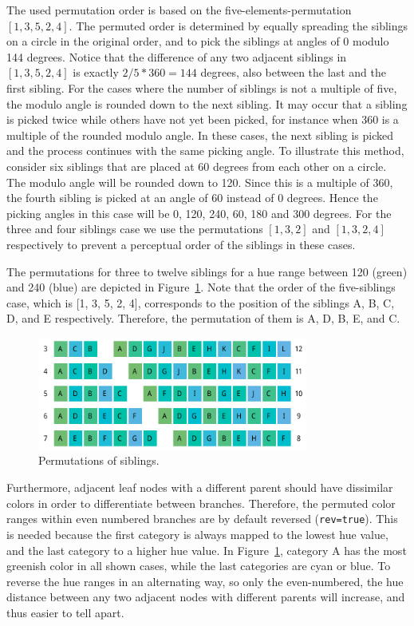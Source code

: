 \documentclass[journal]{vgtc}                %
\begin{document}
The used permutation order is based on the five-elements-permutation $[1, 3, 5, 2, 4]$. The permuted order is determined by equally spreading the siblings on a circle in the original order, and to pick the siblings at angles of 0 modulo 144 degrees. Notice that the difference of any two adjacent siblings in $[1, 3, 5, 2, 4]$ is exactly $2/5 * 360=144$ degrees, also between the last and the first sibling. For the cases where the number of siblings is not a multiple of five, the modulo angle is rounded down to the next sibling. It may occur that a sibling is picked twice while others have not yet been picked, for instance when 360 is a multiple of the rounded modulo angle. In these cases, the next sibling is picked and the process continues with the same picking angle. To illustrate this method, consider six siblings that are placed at 60 degrees from each other on a circle. The modulo angle will be rounded down to 120. Since this is a multiple of 360, the fourth sibling is picked at an angle of 60 instead of 0 degrees. Hence the picking angles in this case will be 0, 120, 240, 60, 180 and 300 degrees. For the three and four siblings case we use the permutations $[1, 3, 2]$ and $[1, 3, 2, 4]$ respectively to prevent a perceptual order of the siblings in these cases.


The permutations for three to twelve siblings for a hue range between 120 (green) and 240 (blue) are depicted in Figure~\ref{fig:perm}. Note that the order of the five-siblings case, which is [1, 3, 5, 2, 4], corresponds to the position of the siblings A, B, C, D, and E respectively. Therefore, the permutation of them is A, D, B, E, and C. 

\begin{figure}[tb]
  \centering
  \includegraphics[width=3.5in]{Permutations.pdf}
  \caption{Permutations of siblings.}\label{fig:perm}
\end{figure}

Furthermore, adjacent leaf nodes with a different parent should have dissimilar colors in order to differentiate between branches. Therefore, the permuted color ranges within even numbered branches are by default reversed (\texttt{rev=true}). This is needed because the first category is always mapped to the lowest hue value, and the last category to a higher hue value. In Figure~\ref{fig:perm}, category A has the most greenish color in all shown cases, while the last categories are cyan or blue. To reverse the hue ranges in an alternating way, so only the even-numbered, the hue distance between any two adjacent nodes with different parents will increase, and thus easier to tell apart. 
\end{document}
